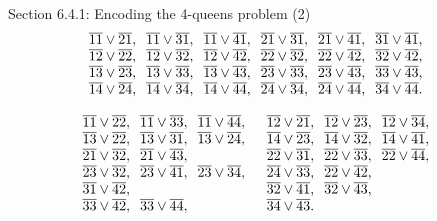 \documentclass[style=simple,size=12pt]{powerdot}
\begin{document}
\begin{wideslide}[bm=,toc=]{Section 6.4.1: Encoding the 4-queens problem (2)}
\begin{displaymath}
\begin{array}{l}
\overline{11}\vee \overline{21},\;\; \overline{11}\vee \overline{31},\;\; \overline{11}\vee \overline{41},\;\; \overline{21}\vee \overline{31},\;\; \overline{21}\vee \overline{41},\;\; \overline{31}\vee \overline{41},\;\;\\
\overline{12}\vee \overline{22},\;\; \overline{12}\vee \overline{32},\;\; \overline{12}\vee \overline{42},\;\; \overline{22}\vee \overline{32},\;\; \overline{22}\vee \overline{42},\;\; \overline{32}\vee \overline{42},\;\;\\
\overline{13}\vee \overline{23},\;\; \overline{13}\vee \overline{33},\;\; \overline{13}\vee \overline{43},\;\; \overline{23}\vee \overline{33},\;\; \overline{23}\vee \overline{43},\;\; \overline{33}\vee \overline{43},\;\;\\
\overline{14}\vee \overline{24},\;\; \overline{14}\vee \overline{34},\;\; \overline{14}\vee \overline{44},\;\; \overline{24}\vee \overline{34},\;\; \overline{24}\vee \overline{44},\;\; \overline{34}\vee \overline{44}.\\
\end{array}
\end{displaymath}

\begin{displaymath}
\begin{array}{ll}
\overline{11}\vee \overline{22},\;\; \overline{11}\vee \overline{33},\;\; \overline{11}\vee \overline{44},\;\;
&
\overline{12}\vee \overline{21},\;\; \overline{12}\vee \overline{23},\;\; \overline{12}\vee \overline{34},\;\;\\   
\overline{13}\vee \overline{22},\;\; \overline{13}\vee \overline{31},\;\; \overline{13}\vee \overline{24},\;\;
&
\overline{14}\vee \overline{23},\;\; \overline{14}\vee \overline{32},\;\; \overline{14}\vee \overline{41},\;\;\\
\overline{21}\vee \overline{32},\;\; \overline{21}\vee \overline{43},\;\;
&
\overline{22}\vee \overline{31},\;\; \overline{22}\vee \overline{33},\;\; \overline{22}\vee \overline{44},\;\;\\
\overline{23}\vee \overline{32},\;\; \overline{23}\vee \overline{41},\;\; \overline{23}\vee \overline{34},\;\;
&
\overline{24}\vee \overline{33},\;\; \overline{22}\vee \overline{42},\;\;\\
\overline{31}\vee \overline{42},\;\;
&
\overline{32}\vee \overline{41},\;\; \overline{32}\vee \overline{43},\;\;\\
\overline{33}\vee \overline{42},\;\; \overline{33}\vee \overline{44},\;\;
&
\overline{34}\vee \overline{43}.\\
\end{array}
\end{displaymath}
\end{wideslide}


\end{document}

